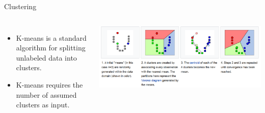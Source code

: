 \documentclass[10pt, aspectratio=169]{beamer} %
\begin{document}
\begin{frame}[fragile, allowframebreaks=0.8]{Clustering}
		\begin{columns}
	    \begin{itemize}
			\item K-means is a standard algorithm for splitting unlabeled data into clusters.
			\item K-means requires the number of assumed clusters as input.
	    \end{itemize}
			\includegraphics[width=\columnwidth]{K_means.png}
			

\end{columns}
\end{frame}
\end{document}
